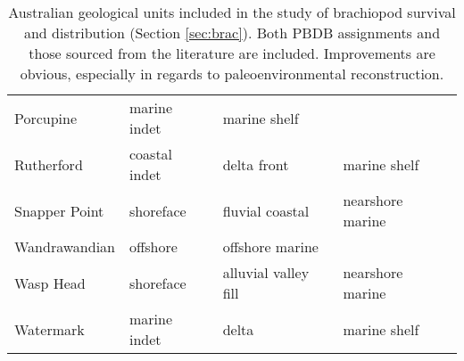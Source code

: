 \begin{table}[ht]
\begin{tabular}{llll}
    Porcupine & marine indet & marine shelf &  \\ 
    Rutherford & coastal indet & delta front & marine shelf \\ 
    Snapper Point & shoreface & fluvial coastal & nearshore marine \\ 
    Wandrawandian & offshore & offshore marine &  \\ 
    Wasp Head & shoreface & alluvial valley fill & nearshore marine \\ 
    Watermark & marine indet & delta & marine shelf \\ 
    \hline
  \end{tabular}
  \caption[Improvements to PBDB geological information]{Australian geological units included in the study of brachiopod survival and distribution (Section \ref{sec:brac}). Both PBDB assignments and those sourced from the literature are included. Improvements are obvious, especially in regards to paleoenvironmental reconstruction.}
  \label{tab:paleoenv}
\end{table}
